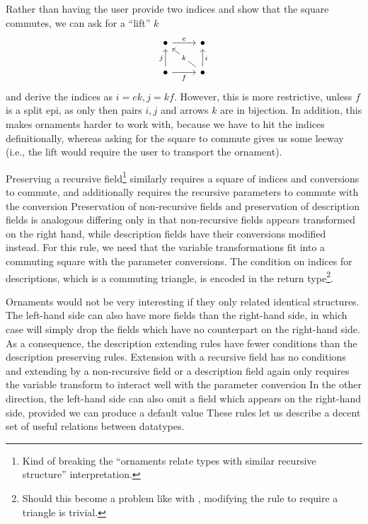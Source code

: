 \begin{remark}\label{rem:orn-lift}
    Rather than having the user provide two indices and show that the square commutes, we can ask for a ``lift'' $k$
    \[\begin{tikzcd}
        \bullet & \bullet \\
        \bullet & \bullet
        \arrow["e", from=1-1, to=1-2]
        \arrow["f"', from=2-1, to=2-2]
        \arrow["j", from=2-1, to=1-1]
        \arrow["i"', from=2-2, to=1-2]
        \arrow["k"{description}, from=2-2, to=1-1]
    \end{tikzcd}\]
    and derive the indices as $i = ek, j = kf$. However, this is more restrictive, unless $f$ is a split epi, as only then pairs $i,j$ and arrows $k$ are in bijection. In addition, this makes ornaments harder to work with, because we have to hit the indices definitionally, whereas asking for the square to commute gives us some leeway (i.e., the lift would require the user to transport the ornament). 
\end{remark}

Preserving a recursive field\footnote{Kind of breaking the ``ornaments relate types with similar recursive structure'' interpretation.} similarly requires a square of indices and conversions to commute, and additionally requires the recursive parameters to commute with the conversion
Preservation of non-recursive fields and preservation of description fields is analogous
differing only in that non-recursive fields appears transformed on the right hand, while description fields have their conversions modified instead. For this rule, we need that the variable transformations fit into a commuting square with the parameter conversions. The condition on indices for descriptions, which is a commuting triangle, is encoded in the return type\footnote{Should this become a problem like with , modifying the rule to require a triangle is trivial.}.

Ornaments would not be very interesting if they only related identical structures. The left-hand side can also have more fields than the right-hand side, in which case  will simply drop the fields which have no counterpart on the right-hand side. As a consequence, the description extending rules have fewer conditions than the description preserving rules. Extension with a recursive field has no conditions
and extending by a non-recursive field or a description field again only requires the variable transform to interact well with the parameter conversion
In the other direction, the left-hand side can also omit a field which appears on the right-hand side, provided we can produce a default value
These rules let us describe a decent set of useful relations between datatypes.

